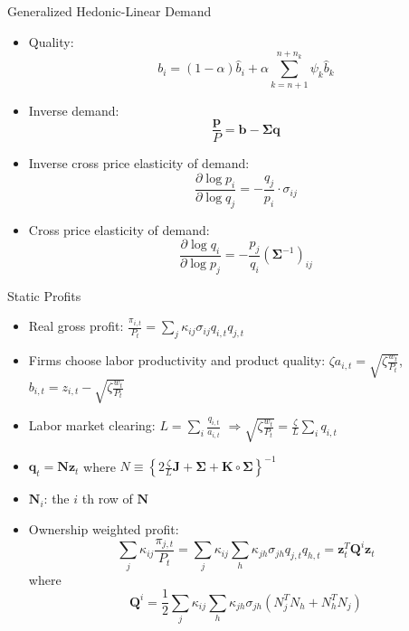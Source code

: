 \documentclass[
  aspectratio=169,  %
]{beamer}
\theoremstyle{plain}
\begin{document}
\begin{frame}{Generalized Hedonic-Linear Demand \citep{Pellegrino2024-dn}}
  \begin{itemize}
    \item Quality:
          \[
            b_{i}=\left(1-\alpha\right)\hat{b}_{i}+\alpha\sum_{k=n+1}^{n+n_{k}}\psi_{k}\hat{b}_{k}
          \]
    \item Inverse demand:
          \[
            \frac{\symbf{p}}{P}=\symbf{b}-\symbf{\Sigma}\symbf{q}
          \]
    \item Inverse cross price elasticity of demand:
          \[
            \frac{\partial\log p_{i}}{\partial\log q_{j}}=-\frac{q_{j}}{p_{i}}\cdot\sigma_{ij}
          \]
    \item Cross price elasticity of demand:
          \[
            \frac{\partial\log q_{i}}{\partial\log p_{j}}=-\frac{p_{j}}{q_{i}}(\symbf{\Sigma}^{-1})_{ij}
          \]
  \end{itemize}
\end{frame}
%
\begin{frame}{Static Profits}
  \begin{itemize}
    \item \label{Q}Real gross profit: $\frac{\pi_{i,t}}{P_{t}}=\sum_{j}\kappa_{ij}\sigma_{ij}q_{i,t}q_{j,t}$
    \item Firms choose labor productivity and product quality: $\zeta a_{i,t}=\sqrt{\zeta\frac{w_{t}}{P_{t}}}$,
          $b_{i,t}=z_{i,t}-\sqrt{\zeta\frac{w_{t}}{P_{t}}}$
    \item Labor market clearing: $L=\sum_{i}\frac{q_{i,t}}{a_{i,t}}$ $\Longrightarrow$$\sqrt{\zeta\frac{w_{t}}{P_{t}}}=\frac{\zeta}{L}\sum_{i}q_{i,t}$
    \item $\symbf{q}_{t}=\symbf{N}\symbf{z}_{t}$ where $N\equiv\left\{ 2\frac{\zeta}{L}\symbf{J}+\symbf{\Sigma}+\symbf{K}\circ\symbf{\Sigma}\right\} ^{-1}$
    \item $\symbf{N}_{i}$: the $i$ th row of $\symbf{N}$
    \item Ownership weighted profit:
          {\small
          \[
            \sum_{j}\kappa_{ij}\frac{\pi_{j,t}}{P_{t}}=\sum_{j}\kappa_{ij}\sum_{h}\kappa_{jh}\sigma_{jh}q_{j,t}q_{h,t}=\symbf{z}_{t}^{T}\symbf{Q}^{i}\symbf{z}_{t}
          \]}
          where
          {\small
          \[
            \symbf{Q}^{i}=\frac{1}{2}\sum_{j}\kappa_{ij}\sum_{h}\kappa_{jh}\sigma_{jh}\left(N_{j}^{T}N_{h}+N_{h}^{T}N_{j}\right)
          \]
          }
          \hyperlink{cournot}{}
  \end{itemize}
\end{frame}
\end{document}
